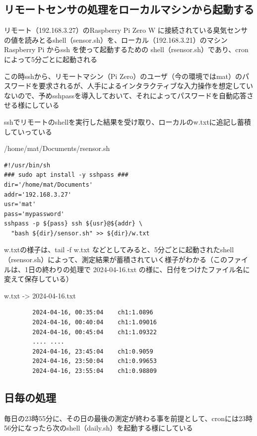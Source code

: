 \documentclass[12pt,a4paper,uplatex]{jsarticle}
\begin{document}
\newpage

\subsection{リモートセンサの処理をローカルマシンから起動する}

リモート（192.168.3.27）のRaspberry Pi Zero W に接続されている臭気センサの値を読みとるshell（sensor.sh）を、ローカル（192.168.3.21）のマシンRaspberry Pi からssh を使って起動するための shell（rsensor.sh）であり、cronによって5分ごとに起動される

この時sshから、リモートマシン（Pi Zero）のユーザ（今の環境ではmat）のパスワードを要求されるが、人手によるインタラクティブな入力操作を想定していないので、予めsshpassを導入しておいて、それによってパスワードを自動応答させる様にしている

sshでリモートのshellを実行した結果を受け取り、ローカルのw.txtに追記し蓄積していっている

\begin{itembox}[l]{/home/mat/Documents/rsensor.sh}
	\begin{verbatim}
#!/usr/bin/sh
### sudo apt install -y sshpass ###
dir='/home/mat/Documents'
addr='192.168.3.27'
usr='mat'
pass='mypassword'
sshpass -p ${pass} ssh ${usr}@${addr} \
  "bash ${dir}/sensor.sh" >> ${dir}/w.txt
	\end{verbatim}
\end{itembox}

w.txtの様子は、tail -f w.txt などとしてみると、5分ごとに起動されたshell（rsensor.sh）によって、測定結果が蓄積されていく様子がわかる（このファイルは、1日の終わりの処理で 2024-04-16.txt の様に、日付をつけたファイル名に変えて保存している）

\begin{itembox}[l]{w.txt -> 2024-04-16.txt}
	\begin{verbatim}
		2024-04-16, 00:35:04	ch1:1.0896
		2024-04-16, 00:40:04	ch1:1.09016
		2024-04-16, 00:45:04	ch1:1.09322
		.... ....
		2024-04-16, 23:45:04	ch1:0.9059
		2024-04-16, 23:50:04	ch1:0.99653
		2024-04-16, 23:55:04	ch1:0.98809
	\end{verbatim}
\end{itembox}

\subsection{日毎の処理}

毎日の23時55分に、その日の最後の測定が終わる事を前提として、cronには23時56分になったら次のshell（daily.sh）を起動する様にしている
\end{document}

